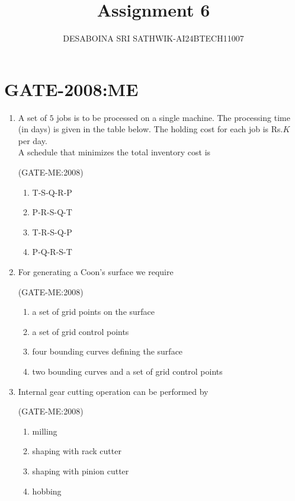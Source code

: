 \documentclass[journal,12pt,onecolumn]{IEEEtran}
\theoremstyle{remark}
\begin{document}

\vspace{3cm}

\title{Assignment 6}
\author{DESABOINA SRI SATHWIK-AI24BTECH11007}
\maketitle
\bigskip

\section*{GATE-2008:ME}

\begin{enumerate}
    \item
	A set of $5$ jobs is to be processed on a single machine. The processing time (in days) is given in the table below. The holding cost for each job is Rs.$K$ per day.\\
		
		A schedule that minimizes the total inventory cost is 

		\hfill{(GATE-ME:2008)}
		\begin{multicols}{2}
			\begin{enumerate}
				\item T-S-Q-R-P
				\item P-R-S-Q-T
				\item T-R-S-Q-P
				\item P-Q-R-S-T
			\end{enumerate}
		\end{multicols}

    \item
        For generating a Coon's surface we require

		\hfill{(GATE-ME:2008)}
        \begin{enumerate}
            
            \item a set of grid points on the surface
            \item a set of grid control points
            \item four bounding curves defining the surface
            \item two bounding curves and a set of grid control points
        \end{enumerate}
    \item
        Internal gear cutting operation can be performed by

        \hfill{(GATE-ME:2008)}
        \begin{enumerate}
            \item milling
            \item shaping with rack cutter
            \item shaping with pinion cutter
            \item hobbing
        \end{enumerate}


\end{enumerate}
\end{document}
